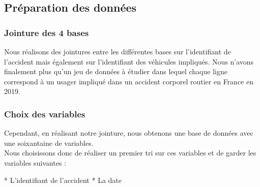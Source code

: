 \documentclass[french,]{tp}
\begin{document}
\hypertarget{pruxe9paration-des-donnuxe9es}{%
\subsection{Préparation des données}\label{pruxe9paration-des-donnuxe9es}}

\hypertarget{jointure-des-4-bases}{%
\subsubsection{Jointure des 4 bases}\label{jointure-des-4-bases}}

Nous réalisons des jointures entre les différentes bases sur l'identifiant de l'accident mais également sur l'identifiant des véhicules impliqués. Nous n'avons finalement plus qu'un jeu de données à étudier dans lequel chaque ligne correspond à un usager impliqué dans un accident corporel routier en France en 2019.

\hypertarget{choix-des-variables}{%
\subsubsection{Choix des variables}\label{choix-des-variables}}

Cependant, en réalisant notre jointure, nous obtenons une base de données avec une soixantaine de variables.\\
Nous choisissons donc de réaliser un premier tri sur ces variables et de garder les variables suivantes :

* L'identifiant de l'accident \textbar{} * La date \textbar{}
\end{document}
